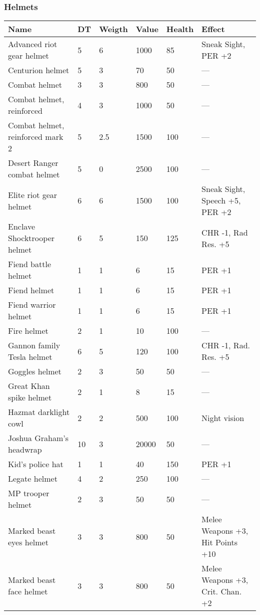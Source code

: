 
\subsubsection{Helmets}
\begin{longtable}{|p{4cm}|p{1.2cm}|p{1.2cm}|p{1.2cm}|p{1.2cm}|p{4cm}|}
\hline
\bfseries Name & \bfseries DT & \bfseries Weigth & \bfseries Value & \bfseries Health & \bfseries Effect \\
\hline
\endhead
Advanced riot gear helmet  & 5 & 6 & 1000 & 85 & Sneak Sight, PER +2  \\
Centurion helmet  & 5 & 3 & 70 & 50 & —  \\
Combat helmet  & 3 & 3 & 800 & 50 & —  \\
Combat helmet, reinforced  & 4 & 3 & 1000 & 50 & —  \\
Combat helmet, reinforced mark 2  & 5 & 2.5  & 1500 & 100 & —  \\
Desert Ranger combat helmet  & 5 & 0 & 2500 & 100 & —  \\
Elite riot gear helmet  & 6 & 6 & 1500 & 100 & Sneak Sight, Speech +5, PER +2  \\
Enclave Shocktrooper helmet  & 6 & 5 & 150 & 125 & CHR -1, Rad Res. +5  \\
Fiend battle helmet  & 1 & 1 & 6 & 15 & PER +1  \\
Fiend helmet  & 1 & 1 & 6 & 15 & PER +1  \\
Fiend warrior helmet  & 1 & 1 & 6 & 15 & PER +1  \\
Fire helmet  & 2 & 1 & 10 & 100 & —  \\
Gannon family Tesla helmet  & 6 & 5 & 120 & 100 & CHR -1, Rad. Res. +5  \\
Goggles helmet  & 2 & 3 & 50 & 50 & —  \\
Great Khan spike helmet  & 2 & 1 & 8 & 15 & —  \\
Hazmat darklight cowl  & 2 & 2 & 500 & 100 & Night vision  \\
Joshua Graham's headwrap  & 10 & 3 & 20000 & 50 & —  \\
Kid's police hat  & 1 & 1 & 40 & 150 & PER +1  \\
Legate helmet  & 4 & 2 & 250 & 100 & —  \\
MP trooper helmet  & 2 & 3 & 50 & 50 & —  \\
Marked beast eyes helmet  & 3 & 3 & 800 & 50 & Melee Weapons +3, Hit Points +10  \\
Marked beast face helmet  & 3 & 3 & 800 & 50 & Melee Weapons +3, Crit. Chan. +2  \\

\end{longtable}
